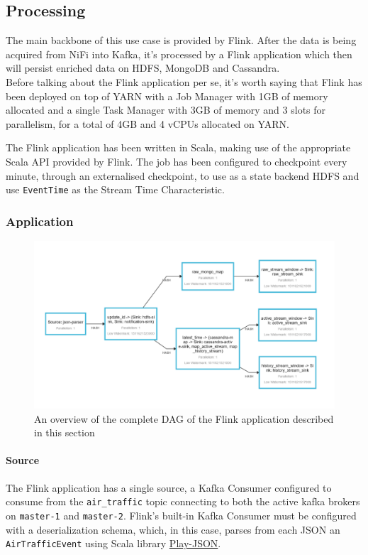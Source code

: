\subsection{Processing}

The main backbone of this use case is provided by Flink. After the data is being acquired from NiFi into Kafka, it's processed by a Flink application which then will persist enriched data on HDFS, MongoDB and Cassandra.
\\
Before talking about the Flink application per se, it's worth saying that Flink has been deployed on top of YARN with a Job Manager with 1GB of memory allocated and a single Task Manager with 3GB of memory and 3 slots for parallelism, for a total of 4GB and 4 vCPUs allocated on YARN. 

The Flink application has been written in Scala, making use of the appropriate Scala API provided by Flink. The job has been configured to checkpoint every minute, through an externalised checkpoint, to use as a state backend HDFS and use \texttt{EventTime} as the Stream Time Characteristic.

\subsubsection{Application}

\begin{figure}[h]
    \centering
    \includegraphics[width=0.8\linewidth]{Figures/flink_job}
    \caption{An overview of the complete DAG of the Flink application described in this section}
    \label{fig:flinkjob}
\end{figure}


\paragraph{Source}
The Flink application has a single source, a Kafka Consumer configured to consume from the \texttt{air\_traffic} topic connecting to both the active kafka brokers on \texttt{master-1} and \texttt{master-2}. Flink's built-in Kafka Consumer must be configured with a deserialization schema, which, in this case, parses from each JSON an \texttt{AirTrafficEvent} using Scala library \href{https://www.playframework.com/documentation/2.6.x/ScalaJson#The-Play-JSON-library}{Play-JSON}.

